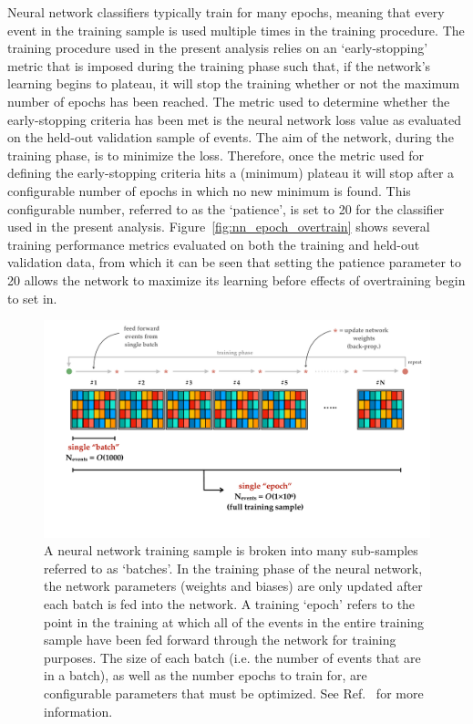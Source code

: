 Neural network classifiers typically train for many epochs, meaning that every event in the training
sample is used multiple times in the training procedure.
The training procedure used in the present analysis relies on an `early-stopping' metric that is imposed during the training phase such that, if the network's learning
begins to plateau, it will stop the training whether or not the maximum number of epochs has been
reached.
The metric used to determine whether the early-stopping criteria has been met is the neural network
loss value as evaluated on the held-out validation sample of events.
The aim of the network, during the training phase, is to minimize the loss.
Therefore, once the metric used for defining the early-stopping criteria hits a (minimum) plateau
it will stop after a configurable number of epochs in which no new minimum is found.
This configurable number, referred to as the `patience', is set to 20 for the classifier used in the present analysis.
Figure~\ref{fig:nn_epoch_overtrain} shows several training performance metrics evaluated on both the
training and held-out validation data, from which it can be seen that setting the patience parameter to 20
allows the network to maximize its learning before effects of overtraining begin to set in.

\begin{figure}[!htb]
    \begin{center}
        \includegraphics[width=1.0\textwidth]{figures/search_hh/mva/nn_batchesPDF}
        \caption{
            A neural network training sample is broken into many sub-samples referred to as `batches'.
            In the training phase of the neural network, the network parameters (weights and biases)
            are only updated after each batch is fed into the network.
            A training `epoch' refers to the point in the training at which all of the events
            in the entire training sample have been fed forward through the network for training purposes.
            The size of each batch (i.e. the number of events that are in a batch), as well as the number
            epochs to train for, are configurable parameters that must be optimized.
            See Ref.~\cite{GoodFellowBook} for more information.
        }
        \label{fig:nn_batches}
    \end{center}
\end{figure}

